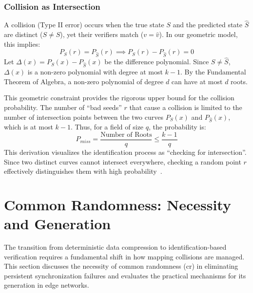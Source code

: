 \subsubsection{Collision as Intersection}
A collision (Type II error) occurs when the true state $S$ and the predicted state $\hat{S}$ are distinct ($S \neq \hat{S}$), yet their verifiers match ($v = \hat{v}$). In our geometric model, this implies:
\begin{equation}
    P_S(r) = P_{\hat{S}}(r) \implies P_S(r) - P_{\hat{S}}(r) = 0
\end{equation}
Let $\Delta(x) = P_S(x) - P_{\hat{S}}(x)$ be the difference polynomial. Since $S \neq \hat{S}$, $\Delta(x)$ is a non-zero polynomial with degree at most $k-1$. By the Fundamental Theorem of Algebra, a non-zero polynomial of degree $d$ can have at most $d$ roots. 

This geometric constraint provides the rigorous upper bound for the collision probability. The number of \enquote{bad seeds} $r$ that cause a collision is limited to the number of intersection points between the two curves $P_S(x)$ and $P_{\hat{S}}(x)$, which is at most $k-1$. Thus, for a field of size $q$, the probability is:
\begin{equation}
    P_{miss} = \frac{\text{Number of Roots}}{q} \le \frac{k-1}{q}
\end{equation}
This derivation visualizes the identification process as \enquote{checking for intersection}. Since two distinct curves cannot intersect everywhere, checking a random point $r$ effectively distinguishes them with high probability~\cite{schwartz1980fast}.


\section{Common Randomness: Necessity and Generation}
\label{sec:common_randomness}

The transition from deterministic data compression to identification-based verification requires a fundamental shift in how mapping collisions are managed. This section discusses the necessity of common randomness (\gls{cr}) in eliminating persistent synchronization failures and evaluates the practical mechanisms for its generation in edge networks.

